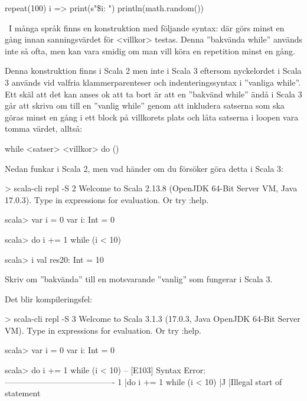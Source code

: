\SubtaskSolved
\begin{Code}
repeat(100){ i =>
  print(s"\$i: ")
  println(math.random())
}
\end{Code}



\QUESTEND



\QUESTBEGIN

\Task  \what~I många språk finns en konstruktion med följande syntax:  där  görs minst en gång innan sanningsvärdet för <villkor> testas. Denna ''bakvända while'' används inte så ofta, men kan vara smidig om man vill köra en repetition minst en gång. 

Denna konstruktion finns i Scala 2 men inte i Scala 3 eftersom nyckelordet  i Scala 3 används vid valfria klammerparenteser och indenteringssyntax i ''vanliga while''. Ett skäl att det kan anses ok att ta bort  är att en ''bakvänd while'' ändå i Scala 3 går att skriva om till en ''vanlig while'' genom att inkludera satserna som ska göras minst en gång i ett block på villkorets plats och låta satserna i loopen vara tomma värdet, alltså:
\begin{Code}
while 
<satser>
<villkor>
do ()  
\end{Code}

\Subtask Nedan funkar i Scala 2, men vad händer om du försöker göra detta i Scala 3:
\begin{REPLnonum}
> scala-cli repl -S 2
Welcome to Scala 2.13.8 (OpenJDK 64-Bit Server VM, Java 17.0.3).
Type in expressions for evaluation. Or try :help.

scala> var i = 0
var i: Int = 0

scala> do i += 1 while (i < 10)

scala> i
val res20: Int = 10
\end{REPLnonum}

\Subtask Skriv om ''bakvända''  till en motsvarande ''vanlig''  som fungerar i Scala 3.


\SOLUTION

\TaskSolved \what

\SubtaskSolved Det blir kompileringsfel:
\begin{REPLnonum}
> scala-cli repl -S 3
Welcome to Scala 3.1.3 (17.0.3, Java OpenJDK 64-Bit Server VM).
Type in expressions for evaluation. Or try :help.
                                                                                    
scala> var i = 0
var i: Int = 0
                                                                                    
scala> do i += 1 while (i < 10)
-- [E103] Syntax Error: ----------------------------------------
1 |do i += 1 while (i < 10)
  |^^
  |Illegal start of statement
\end{REPLnonum}

